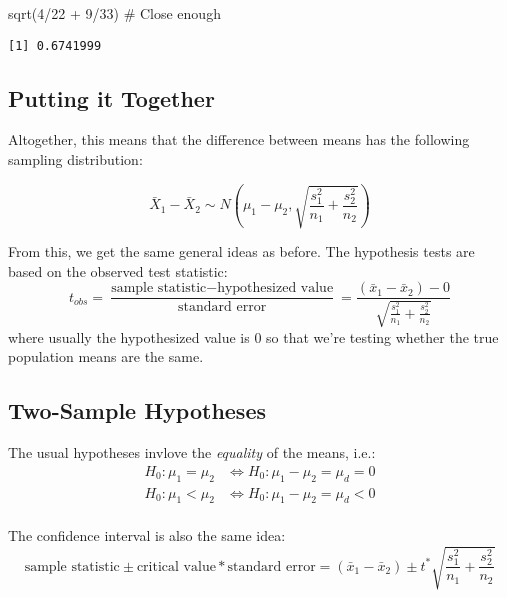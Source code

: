 \documentclass[
  letterpaper,
  DIV=11,
  numbers=noendperiod]{scrreprt}
\newenvironment{Shaded}{\begin{snugshade}}{\end{snugshade}}
\newcommand{\CommentTok}[1]{\textcolor[rgb]{0.37,0.37,0.37}{#1}}
\newcommand{\DecValTok}[1]{\textcolor[rgb]{0.68,0.00,0.00}{#1}}
\newcommand{\FunctionTok}[1]{\textcolor[rgb]{0.28,0.35,0.67}{#1}}
\newcommand{\NormalTok}[1]{\textcolor[rgb]{0.00,0.23,0.31}{#1}}
\newcommand{\SpecialCharTok}[1]{\textcolor[rgb]{0.37,0.37,0.37}{#1}}
\begin{document}
\begin{Shaded}
\begin{Highlighting}[]
\FunctionTok{sqrt}\NormalTok{(}\DecValTok{4}\SpecialCharTok{/}\DecValTok{22} \SpecialCharTok{+} \DecValTok{9}\SpecialCharTok{/}\DecValTok{33}\NormalTok{) }\CommentTok{\# Close enough}
\end{Highlighting}
\end{Shaded}

\begin{verbatim}
[1] 0.6741999
\end{verbatim}

\hypertarget{putting-it-together}{%
\subsection{Putting it Together}\label{putting-it-together}}

Altogether, this means that the difference between means has the
following sampling distribution:

\[
\bar X_1 - \bar X_2 \sim N\left(\mu_1 - \mu_2, \sqrt{\frac{s_1^2}{n_1} + \frac{s_2^2}{n_2}}\right)
\]

From this, we get the same general ideas as before. The hypothesis tests
are based on the observed test statistic: \[
t_{obs} = \frac{\text{sample statistic} - \text{hypothesized value}}{\text{standard error}} = \frac{(\bar x_1 - \bar x_2) - 0}{\sqrt{\frac{s_1^2}{n_1} + \frac{s_2^2}{n_2}}}
\] where usually the hypothesized value is 0 so that we're testing
whether the true population means are the same.

\hypertarget{two-sample-hypotheses}{%
\subsection{Two-Sample Hypotheses}\label{two-sample-hypotheses}}

The usual hypotheses invlove the \emph{equality} of the means, i.e.:
\begin{align*}
H_0: \mu_1 = \mu_2 &\Leftrightarrow H_0:\mu_1 - \mu_2 = \mu_d = 0\\
H_0: \mu_1 < \mu_2 &\Leftrightarrow H_0:\mu_1 - \mu_2 = \mu_d < 0\\
\end{align*}

The confidence interval is also the same idea: \[
\text{sample statistic}\pm\text{critical value}*\text{standard error} = (\bar x_1 - \bar x_2)\pm t^*\sqrt{\frac{s_1^2}{n_1} + \frac{s_2^2}{n_2}}
\]
\end{document}
